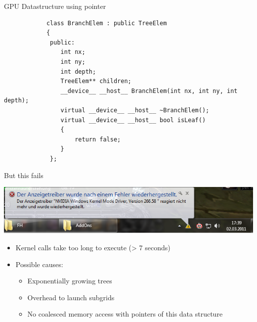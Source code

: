 \documentclass[fleqn,11pt,aspectratio=43]{beamer}
\begin{document}
\begin{frame}[fragile]{GPU Datastructure using pointer}
	\begin{verbatim}
			class BranchElem : public TreeElem
			{
			 public:
			    int nx;
			    int ny;
			    int depth;
			    TreeElem** children;
			    __device__ __host__ BranchElem(int nx, int ny, int depth);
			    virtual __device__ __host__ ~BranchElem();
			    virtual __device__ __host__ bool isLeaf()
			    {
			        return false;
			    }
			 };
	\end{verbatim}
\end{frame}

\begin{frame}{But this fails}
	\begin{center}
	\includegraphics[width=1\textwidth]{fehler.png}
	\end{center}
	\begin{itemize}
		\item Kernel calls take too long to execute (> 7 seconds)
		\item Possible causes:
		\begin{itemize}
			\item Exponentially growing trees 
			\item Overhead to launch subgrids
			\item No coalesced memory access with pointers of this data structure
		\end{itemize}
	\end{itemize}
\end{frame}
\end{document}
